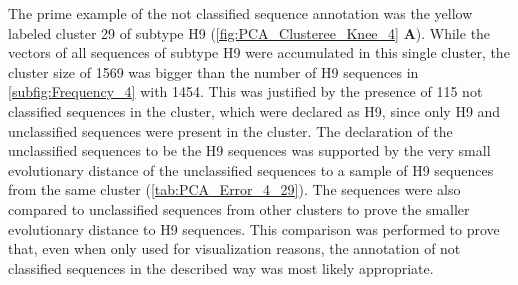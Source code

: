 \begin{table}[!hbt]
    \centering
    \caption[Unclassified sequences in segment 4 cluster 29 with PK]{\textbf{Unclassified sequences in segment 4 cluster 29 with PK.} The \glspl{MSA} mean distance of the given sequences in comparison to a sample of H9 sequences of the same cluster and a sample of unclassified sequences from other clusters was calculated. Only the first 20 columns are presented, the full table can be found in the projects GitHub Repository\footnotemark.}
    \label{tab:PCA_Error_4_29}
\end{table}

\vspace{1em}

The prime example of the not classified sequence annotation was the yellow labeled cluster 29 of subtype H9 (\autoref{fig:PCA_Clusteree_Knee_4} \textbf{\textsf{A}}). While the vectors of all sequences of subtype H9 were accumulated in this single cluster, the cluster size of 1569 was bigger than the number of H9 sequences in \autoref{subfig:Frequency_4} with 1454. This was justified by the presence of 115 not classified sequences in the cluster, which were declared as H9, since only H9 and unclassified sequences were present in the cluster. The declaration of the unclassified sequences to be the H9 sequences was supported by the very small evolutionary distance of the unclassified sequences to a sample of H9 sequences from the same cluster (\autoref{tab:PCA_Error_4_29}). The sequences were also compared to unclassified sequences from other clusters to prove the smaller evolutionary distance to H9 sequences. This comparison was performed to prove that, even when only used for visualization reasons, the annotation of not classified sequences in the described way was most likely appropriate.

